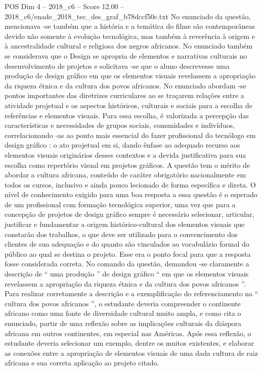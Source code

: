 \begin{textsample}{POS Dim 4 – 2018\_c6 – Score 12.00 – 2018\_c6/enade\_2018\_tec\_des\_graf\_b78dccf50c.txt}
No enunciado da questão, mencionava -se também que a história e a temática do filme são contemporâneas devido não somente à evolução tecnológica, mas também à reverência à origem e à ancestralidade cultural e religiosa dos negros africanos.
No enunciado também se considerava que o Design se apropria de elementos e narrativas culturais no desenvolvimento de projetos e solicitava -se que o aluno descrevesse uma produção de design gráfico em que os elementos visuais revelassem a apropriação da riqueza étnica e da cultura dos povos africanos.
No enunciado abordam -se pontos importantes das diretrizes curriculares ao se traçarem relações entre a atividade projetual e os aspectos históricos, culturais e sociais para a escolha de referências e elementos visuais.
Para essa escolha, é valorizada a percepção das características e necessidades de grupos sociais, comunidades e indivíduos, correlacionando -as ao ponto mais essencial do fazer profissional do tecnólogo em design gráfico : o ato projetual em si, dando ênfase ao adequado recurso aos elementos visuais originários desses contextos e a devida justificativa para sua escolha como repertório visual em projetos gráficos.
A questão tem o mérito de abordar a cultura africana, conteúdo de caráter obrigatório nacionalmente em todos os cursos, inclusivo e ainda pouco lecionado de forma específica e direta.
O nível de conhecimento exigido para uma boa resposta a essa questão é o esperado de um profissional com formação tecnológica superior, uma vez que para a concepção de projetos de design gráfico sempre é necessário selecionar, articular, justificar e fundamentar a origem histórico-cultural dos elementos visuais que constarão dos trabalhos, o que deve ser utilizado para o convencimento dos clientes de sua adequação e do quanto são vinculados ao vocabulário formal do público ao qual se destina o projeto.
Esse era o ponto focal para que a resposta fosse considerada correta.
No comando da questão, demandou -se claramente a descrição de “ uma produção ” de design gráfico “ em que os elementos visuais revelassem a apropriação da riqueza étnica e da cultura dos povos africanos ”.
Para realizar corretamente a descrição e a exemplificação do referenciamento na “ cultura dos povos africanos ”, o estudante deveria compreender o continente africano como uma fonte de diversidade cultural muito ampla, e como cita o enunciado, partir de uma reflexão sobre as implicações culturais da diáspora africana em outros continentes, em especial nas Américas.
Após essa reflexão, o estudante deveria selecionar um exemplo, dentre os muitos existentes, e elaborar as conexões entre a apropriação de elementos visuais de uma dada cultura de raiz africana e sua correta aplicação ao projeto citado.

\end{textsample}
